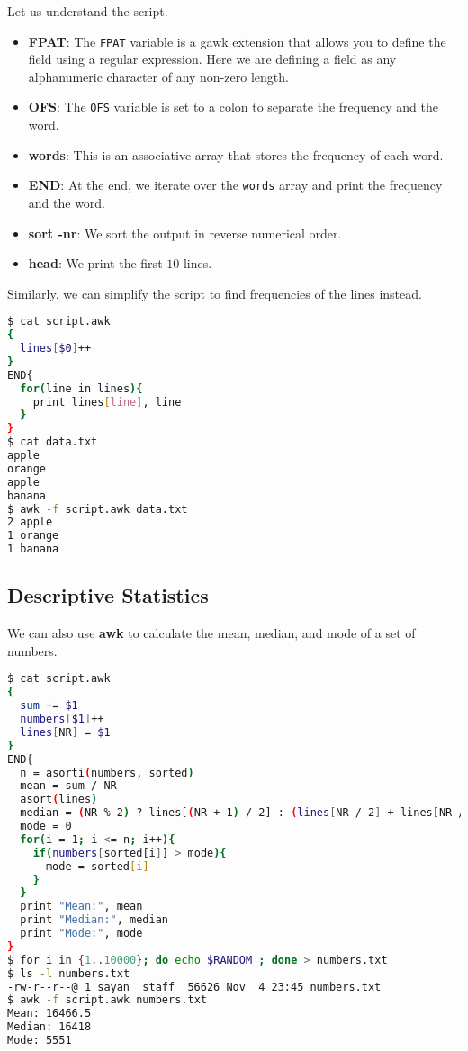 Let us understand the script.

\begin{itemize}
  \item \textbf{FPAT}: The \lstinline|FPAT| variable is a gawk extension that allows you to define the field using a regular expression.
  Here we are defining a field as any alphanumeric character of any non-zero length.
  \item \textbf{OFS}: The \lstinline|OFS| variable is set to a colon to separate the frequency and the word.
  \item \textbf{words}: This is an associative array that stores the frequency of each word.
  \item \textbf{END}: At the end, we iterate over the \lstinline|words| array and print the frequency and the word.
  \item \textbf{sort -nr}: We sort the output in reverse numerical order.
  \item \textbf{head}: We print the first $10$ lines.
\end{itemize}

Similarly, we can simplify the script to find frequencies of the lines instead.

\begin{lstlisting}[language=bash]
$ cat script.awk
{
  lines[$0]++
}
END{
  for(line in lines){
    print lines[line], line
  }
}
$ cat data.txt
apple
orange
apple
banana
$ awk -f script.awk data.txt
2 apple
1 orange
1 banana
\end{lstlisting}

\subsection{Descriptive Statistics}

We can also use \textbf{awk} to calculate the mean, median, and mode of a set of numbers.

\begin{lstlisting}[language=bash]
$ cat script.awk
{
  sum += $1
  numbers[$1]++
  lines[NR] = $1
}
END{
  n = asorti(numbers, sorted)
  mean = sum / NR
  asort(lines)
  median = (NR % 2) ? lines[(NR + 1) / 2] : (lines[NR / 2] + lines[NR / 2 + 1]) / 2
  mode = 0
  for(i = 1; i <= n; i++){
    if(numbers[sorted[i]] > mode){
      mode = sorted[i]
    }
  }
  print "Mean:", mean
  print "Median:", median
  print "Mode:", mode
}
$ for i in {1..10000}; do echo $RANDOM ; done > numbers.txt
$ ls -l numbers.txt
-rw-r--r--@ 1 sayan  staff  56626 Nov  4 23:45 numbers.txt
$ awk -f script.awk numbers.txt
Mean: 16466.5
Median: 16418
Mode: 5551
\end{lstlisting}


